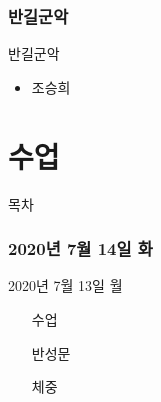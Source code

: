 \documentclass[aspectratio=1610,17pt,xcolor=pdftex,dvipsnames,table,handout]{beamer}
\begin{document}
		\section{ 반길군악 }

		\begin{frame} [t,plain]
			\begin{block} { 반길군악 }
			\begin{itemize}
				\item 조승희
			\end{itemize}
			\end{block}
		\end{frame}




		\part{ 수업 }
		\frame{\partpage}


		\begin{frame} [plain]{목차}
		\tableofcontents
		\end{frame}



		\section{ 2020년 7월 14일 화 }

		\begin{frame} [t,plain]
			\begin{block} { 2020년 7월 13일 월 }

			\setlength{\leftmargini}{4em}			
			\begin{itemize}
				\item [수업] 
				\item [반성문] 
				\item [체중] 
			\end{itemize}
			\end{block}
		\end{frame}
\end{document}
